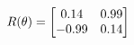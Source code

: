 \documentclass[preview]{standalone}
\begin{document}
\begin{align*}
\special{dvisvgm:raw <g id='unique000'>}R(\theta) = \begin{bmatrix}0.14 & 0.99\\-0.99 & 0.14\end{bmatrix}\special{dvisvgm:raw </g>}
\end{align*}
\end{document}
